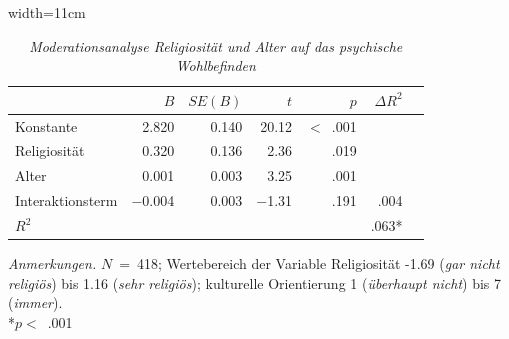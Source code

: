 \begin{table}[htb]
  \caption[Moderationsanalyse Religiosität und Alter auf das psychische Wohlbefinden]{\textit {Moderationsanalyse Religiosität und Alter auf das psychische Wohlbefinden}} 
  \label{Moderationsanalyse}
  \centering
  \begin{adjustbox}{width=11cm} %
  \small
  \begin{tabular}{lrrrrrr}
    \hline
               & $B$   & $SE(B)$&  $t$    & $p$   & $\Delta R^{2}$\\
    \hline
  Konstante    & 2.820 & 0.140 & 20.12    & $<$~.001 & \\
  Religiosität & 0.320 & 0.136 & 2.36     & .019     & \\
  Alter        & 0.001 & 0.003 & 3.25     & .001     & \\
  Interaktionsterm & $-$0.004  & 0.003 & $-$1.31   & .191     & .004 \\
  $R^{2}$      &       &      &        &          & .063* \\
     \hline
  \end{tabular}
  \end{adjustbox}
  
  \begin{tablenotes}
      \item \textit{Anmerkungen.} \(N\)~=~418; Wertebereich der Variable Religiosität -1.69 (\textit{gar nicht religiös}) bis 1.16 (\textit{sehr religiös}); kulturelle Orientierung 1 (\textit{überhaupt nicht}) bis 7 (\textit{immer}).\\ *$p<$~.001
    \end{tablenotes}
  \end{table}


